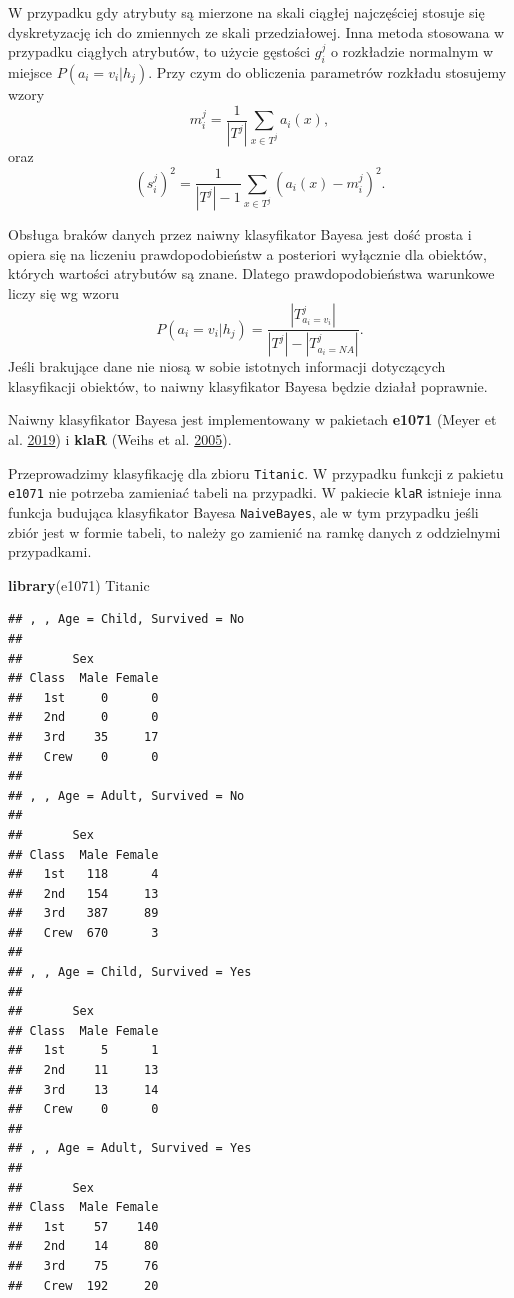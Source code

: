 \documentclass[]{book}
\newenvironment{Shaded}{\begin{snugshade}}{\end{snugshade}}
\newcommand{\KeywordTok}[1]{\textcolor[rgb]{0.13,0.29,0.53}{\textbf{#1}}}
\newcommand{\NormalTok}[1]{#1}
\theoremstyle{plain}
\theoremstyle{definition}
\theoremstyle{definition}
\theoremstyle{definition}
\theoremstyle{definition}
\theoremstyle{remark}
\let\BeginKnitrBlock\begin \let\EndKnitrBlock\end
\begin{document}
W przypadku gdy atrybuty są mierzone na skali ciągłej najczęściej stosuje się dyskretyzację ich do zmiennych ze skali przedziałowej. Inna metoda stosowana w przypadku ciągłych atrybutów, to użycie gęstości \(g_i^j\) o rozkładzie normalnym w miejsce \(P(a_i=v_i|h_j)\). Przy czym do obliczenia parametrów rozkładu stosujemy wzory
\begin{equation}\label{sred}
        m_i^j=\frac{1}{|T^j|}\sum_{x\in T^j}a_i(x),
\end{equation}
oraz
\begin{equation}\label{odch}
        (s_i^j)^2=\frac{1}{|T^j|-1}\sum_{x\in T^j}(a_i(x)-m_i^j)^2.
\end{equation}

Obsługa braków danych przez naiwny klasyfikator Bayesa jest dość prosta i opiera się na liczeniu prawdopodobieństw a posteriori wyłącznie dla obiektów, których wartości atrybutów są znane. Dlatego prawdopodobieństwa warunkowe liczy się wg wzoru
\begin{equation}\label{pr_war}
        P(a_i=v_i|h_j)=\frac{|T^j_{a_i=v_i}|}{|T^j|-|T^j_{a_i=NA}|}.
\end{equation}
Jeśli brakujące dane nie niosą w sobie istotnych informacji dotyczących klasyfikacji obiektów, to naiwny klasyfikator Bayesa będzie działał poprawnie.

Naiwny klasyfikator Bayesa jest implementowany w pakietach \textbf{e1071} (Meyer et al. \protect\hyperlink{ref-R-e1071}{2019}) i \textbf{klaR} (Weihs et al. \protect\hyperlink{ref-R-klaR}{2005}).

\BeginKnitrBlock{example}
\protect\hypertarget{exm:unnamed-chunk-74}{}{\label{exm:unnamed-chunk-74} }Przeprowadzimy klasyfikację dla zbioru \texttt{Titanic}. W przypadku funkcji z pakietu \texttt{e1071} nie potrzeba zamieniać tabeli na przypadki. W pakiecie \texttt{klaR} istnieje inna funkcja budująca klasyfikator Bayesa \texttt{NaiveBayes}, ale w tym przypadku jeśli zbiór jest w formie tabeli, to należy go zamienić na ramkę danych z oddzielnymi przypadkami.
\EndKnitrBlock{example}

\begin{Shaded}
\begin{Highlighting}[]
\KeywordTok{library}\NormalTok{(e1071)}
\NormalTok{Titanic}
\end{Highlighting}
\end{Shaded}

\begin{verbatim}
## , , Age = Child, Survived = No
## 
##       Sex
## Class  Male Female
##   1st     0      0
##   2nd     0      0
##   3rd    35     17
##   Crew    0      0
## 
## , , Age = Adult, Survived = No
## 
##       Sex
## Class  Male Female
##   1st   118      4
##   2nd   154     13
##   3rd   387     89
##   Crew  670      3
## 
## , , Age = Child, Survived = Yes
## 
##       Sex
## Class  Male Female
##   1st     5      1
##   2nd    11     13
##   3rd    13     14
##   Crew    0      0
## 
## , , Age = Adult, Survived = Yes
## 
##       Sex
## Class  Male Female
##   1st    57    140
##   2nd    14     80
##   3rd    75     76
##   Crew  192     20
\end{verbatim}
\end{document}
